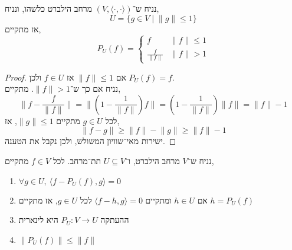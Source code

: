 \begin{example}
	נניח ש־$(V, \langle \cdot, \cdot \rangle)$ מרחב הילברט כלשהו,
	ונניח,
	\[
		U
		= \{ g \in V \mid \lVert g \rVert \le 1 \}
	\]
	אז מתקיים,
	\[
		P_U(f)
		= \begin{cases}
			f & \lVert f \rVert \le 1 \\
			\frac{f}{\lVert f \rVert} & \lVert f \rVert > 1
		\end{cases}
	\]
\end{example}
\begin{proof}
	אם $\lVert f \rVert \le 1$ אז $f \in U$ ולכן $P_U(f) = f$. \\
	נניח אם כך ש־$\lVert f \rVert > 1$.
	מתקיים,
	\[
		\lVert f - \frac{f}{\lVert f \rVert} \rVert
		= \lVert (1 - \frac{1}{\lVert f \rVert}) f \rVert
		= (1 - \frac{1}{\lVert f \rVert}) \lVert f \rVert
		= \lVert f \rVert - 1
	\]
	לכל $g \in U$ מתקיים $\lVert g \rVert \le 1$, אז,
	\[
		\lVert f - g \rVert
		\ge \lVert f \rVert - \lVert g \rVert
		\ge \lVert f \rVert - 1
	\]
	ישירות מאי־שוויון המשולש, ולכן נקבל את הטענה.
\end{proof}
\begin{theorem}
	נניח ש־$V$ מרחב הילברט, ו־$U \subseteq V$ תת־מרחב.
	לכל $f \in V$ מתקיים,
	\begin{enumerate}
		\item $\forall g \in U,\ \langle f - P_U(f), g \rangle = 0$
		\item אם $h \in U$ ומתקיים $\langle f - h, g \rangle = 0$ לכל $g \in U$, אז מתקיים $h = P_U(f)$
		\item ההעתקה $P_U : V \to U$ היא לינארית
		\item $\lVert P_U(f) \rVert \le \lVert f \rVert$
	\end{enumerate}
\end{theorem}
